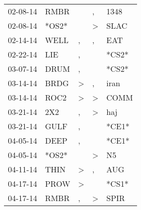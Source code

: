 \begin{supertabular}{p{0.07\textwidth}p{0.06\textwidth}p{0.02\textwidth}p{0.02\textwidth}p{0.06\textwidth}}
          02-08-14\textsuperscript{} &           RMBR\textsuperscript{} &                  &                , &           1348\textsuperscript{} \\
          02-08-14\textsuperscript{} &                            *OS2* &                  &     \textgreater &           SLAC\textsuperscript{} \\
          02-14-14\textsuperscript{} &           WELL\textsuperscript{} &                , &                , &            EAT\textsuperscript{} \\
          02-22-14\textsuperscript{} &            LIE\textsuperscript{} &                , &                  &                            *CS2* \\
          03-07-14\textsuperscript{} &           DRUM\textsuperscript{} &                , &                  &                            *CS2* \\
          03-14-14\textsuperscript{} &           BRDG\textsuperscript{} &     \textgreater &                , &           iran\textsuperscript{} \\
          03-14-14\textsuperscript{} &           ROC2\textsuperscript{} &     \textgreater &     \textgreater &           COMM\textsuperscript{} \\
          03-21-14\textsuperscript{} &            2X2\textsuperscript{} &                , &     \textgreater &            haj\textsuperscript{} \\
          03-21-14\textsuperscript{} &           GULF\textsuperscript{} &                , &                  &                            *CE1* \\
          04-05-14\textsuperscript{} &           DEEP\textsuperscript{} &                , &                  &                            *CE1* \\
          04-05-14\textsuperscript{} &                            *OS2* &                  &     \textgreater &             N5\textsuperscript{} \\
          04-11-14\textsuperscript{} &           THIN\textsuperscript{} &     \textgreater &                , &            AUG\textsuperscript{} \\
          04-17-14\textsuperscript{} &           PROW\textsuperscript{} &     \textgreater &                  &                            *CS1* \\
          04-17-14\textsuperscript{} &           RMBR\textsuperscript{} &                , &     \textgreater &           SPIR\textsuperscript{} \\

\end{supertabular}
